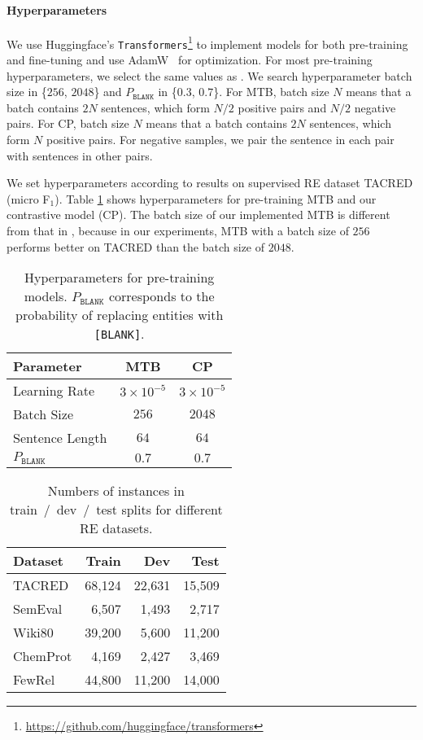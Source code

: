 \documentclass[11pt,a4paper]{article}
\begin{document}
\paragraph{Hyperparameters} We use Huggingface's \texttt{Transformers}\footnote{\url{https://github.com/huggingface/transformers}} to implement models for both pre-training and fine-tuning and use AdamW~\citep{loshchilov2018fixing} for optimization. 
For most pre-training hyperparameters, we select the same values as \citet{soares2019matching}. We search hyperparameter batch size in \{$256$, $2048$\} and $P_\texttt{BLANK}$ in \{$0.3$, $0.7$\}. For MTB, batch size $N$ means that a batch contains $2N$ sentences, which form $N/2$ positive pairs and $N/2$ negative pairs. For CP, batch size $N$ means that a batch contains $2N$ sentences, which form $N$ positive pairs.
For negative samples, we pair the sentence in each pair with sentences in other pairs. 


We set hyperparameters according to results on supervised RE dataset TACRED (micro F$_1$).
Table \ref{tab:params} shows hyperparameters for pre-training MTB and our contrastive model (CP). The batch size of our implemented MTB is different from that in \citet{soares2019matching}, because in our experiments, MTB with a batch size of $256$ performs better on TACRED than the batch size of $2048$. 


\begin{table}[]
\small
    \centering
    \begin{tabular}{l|cc}
        \toprule
        \textbf{Parameter} &  \textbf{MTB} & \textbf{CP} \\
        \midrule 
        Learning Rate & $3\times10^{-5}$ & $3\times10^{-5}$\\
        Batch Size & $256$ & $2048$ \\
        Sentence Length & $64$ & $64$ \\
        $P_{\texttt{BLANK}}$ & $0.7$ & $0.7$ \\
        \bottomrule
    \end{tabular}
    \caption{Hyperparameters for pre-training models. $P_{\texttt{BLANK}}$ corresponds to the probability of replacing entities with \texttt{[BLANK]}.}
    \label{tab:params}
\end{table}

\begin{table}[t]
\small
    \centering
    \begin{tabular}{l|rrr}
        \toprule
        \textbf{Dataset} &  \textbf{Train} & \textbf{Dev} & \textbf{Test} \\
        \midrule 
        TACRED & 68,124 & 22,631 & 15,509 \\
        SemEval & 6,507 & 1,493 & 2,717 \\
        Wiki80 & 39,200 & 5,600& 11,200   \\
        ChemProt & 4,169 & 2,427& 3,469 \\
        FewRel &44,800 & 11,200& 14,000\\ 
        \bottomrule
    \end{tabular}
    \caption{Numbers of instances in train~/~dev~/~test splits for different RE datasets.}
    \label{tab:data_size}
\end{table}
\end{document}
